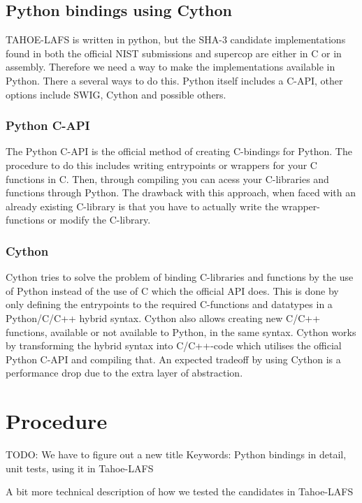 \documentclass[english,12pt,a4paper]{book}
\begin{document}
\section{Python bindings using Cython}
TAHOE-LAFS is written in python, but the SHA-3 candidate implementations found
in both the official NIST submissions and supercop are either in C or in
assembly. Therefore we need a way to make the implementations available in
Python. There a several ways to do this. Python itself includes a C-API,  
other options include SWIG, Cython and possible others.

\subsection{Python C-API}
The Python C-API is the official method of creating C-bindings for Python. The
procedure to do this includes writing entrypoints or wrappers for your C
functions in C. Then, through compiling you can acess your C-libraries and
functions through Python. The drawback with this approach, when faced with an
already existing C-library is that you have to actually write the
wrapper-functions or modify the C-library.

\subsection{Cython}
Cython tries to solve the problem of binding C-libraries and functions by the
use of Python instead of the use of C which the official API does. This is done
by only defining the entrypoints to the required C-functions and datatypes in a
Python/C/C++ hybrid syntax. Cython also allows creating new C/C++ functions,
available or not available to Python, in the same syntax. Cython works by
transforming the hybrid syntax into C/C++-code which utilises the official
Python C-API and compiling that. An expected tradeoff by using Cython is a
performance drop due to the extra layer of abstraction.


\chapter{Procedure}

TODO: We have to figure out a new title
Keywords: Python bindings in detail, unit tests, using it in Tahoe-LAFS

A bit more technical description of how we tested the candidates in Tahoe-LAFS
\end{document}
